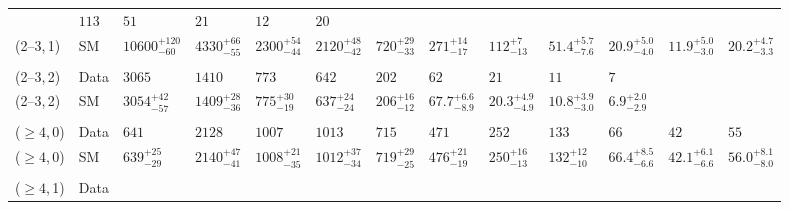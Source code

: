 \begin{table}[h!]
{\begin{tabular}{ lllllllllllll }
               & $113$
               & $51$
               & $21$
               & $12$
               & $20$                                          \\
               (2--3,\,1)
               & SM         
               & $10600^{+120}_{-60}$ %
               & $4330^{+66}_{-55}$
               & $2300^{+54}_{-44}$
               & $2120^{+48}_{-42}$
               & $720^{+29}_{-33}$
               & $271^{+14}_{-17}$
               & $112^{+7}_{-13}$
               & $51.4^{+5.7}_{-7.6}$
               & $20.9^{+5.0}_{-4.0}$
               & $11.9^{+5.0}_{-3.0}$
               & $20.2^{+4.7}_{-3.3}$                          \\\\[-2ex]
               (2--3,\,2)
               & Data
               & $3065$
               & $1410$
               & $773$
               & $642$
               & $202$
               & $62$
               & $21$
               & $11$
               & $7$                                           \\
               (2--3,\,2)
               & SM
               & $3054^{+42}_{-57}$
               & $1409^{+28}_{-36}$
               & $775^{+30}_{-19}$
               & $637^{+24}_{-24}$
               & $206^{+16}_{-12}$
               & $67.7^{+6.6}_{-8.9}$
               & $20.3^{+4.9}_{-4.9}$
               & $10.8^{+3.9}_{-3.0}$
               & $6.9^{+2.0}_{-2.9}$                           \\\\[-2ex]
               ($\geq4$,\,0)
               & Data
               & $641$
               & $2128$
               & $1007$
               & $1013$
               & $715$
               & $471$
               & $252$
               & $133$
               & $66$
               & $42$
               & $55$                                          \\
               ($\geq4$,\,0)
               & SM
               & $639^{+25}_{-29}$
               & $2140^{+47}_{-41}$
               & $1008^{+21}_{-35}$
               & $1012^{+37}_{-34}$
               & $719^{+29}_{-25}$
               & $476^{+21}_{-19}$
               & $250^{+16}_{-13}$
               & $132^{+12}_{-10}$
               & $66.4^{+8.5}_{-6.6}$
               & $42.1^{+6.1}_{-6.6}$
               & $56.0^{+8.1}_{-8.0}$                          \\\\[-2ex]
               ($\geq4$,\,1)
               & Data

\end{tabular}}
\end{table}
